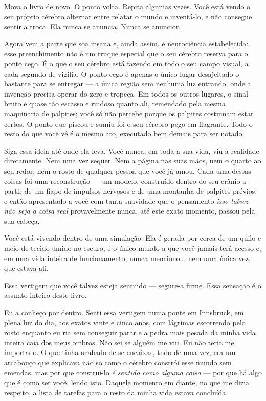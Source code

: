 \documentclass[11pt, twoside, openright]{book}
\begin{document}
Mova o livro de novo. O ponto volta. Repita algumas vezes. Você está vendo o seu próprio cérebro alternar entre relatar o mundo e inventá-lo, e não consegue sentir a troca. Ela nunca se anuncia. Nunca se anunciou.

Agora vem a parte que soa insana e, ainda assim, é neurociência estabelecida: esse preenchimento não é um truque especial que o seu cérebro reserva para o ponto cego. É o que o seu cérebro está fazendo em todo o seu campo visual, a cada segundo de vigília. O ponto cego é apenas o único lugar desajeitado o bastante para se entregar --- a única região sem nenhuma luz entrando, onde a invenção precisa operar do zero e tropeça. Em todos os outros lugares, o sinal bruto é quase tão escasso e ruidoso quanto ali, remendado pela mesma maquinaria de palpites; você só não percebe porque os palpites costumam estar certos. O ponto que piscou e sumiu foi o seu cérebro pego em flagrante. Todo o resto do que você vê é o mesmo ato, executado bem demais para ser notado.

Siga essa ideia até onde ela leva. Você nunca, em toda a sua vida, viu a realidade diretamente. Nem uma vez sequer. Nem a página nas suas mãos, nem o quarto ao seu redor, nem o rosto de qualquer pessoa que você já amou. Cada uma dessas coisas foi uma reconstrução --- um modelo, construído dentro do seu crânio a partir de um fiapo de impulsos nervosos e de uma montanha de palpites prévios, e então apresentado a você com tanta suavidade que o pensamento \textit{isso talvez não seja a coisa real} provavelmente nunca, até este exato momento, passou pela sua cabeça.

Você está vivendo dentro de uma simulação. Ela é gerada por cerca de um quilo e meio de tecido úmido no escuro, é o único mundo a que você jamais terá acesso e, em uma vida inteira de funcionamento, nunca mencionou, nem uma única vez, que estava ali.

Essa vertigem que você talvez esteja sentindo --- segure-a firme. Essa sensação é o assunto inteiro deste livro.

Eu a conheço por dentro. Senti essa vertigem numa ponte em Innsbruck, em plena luz do dia, aos exatos vinte e cinco anos, com lágrimas escorrendo pelo rosto enquanto eu ria sem conseguir parar e a pedra mais pesada da minha vida inteira caía dos meus ombros. Não sei se alguém me viu. Eu não teria me importado. O que tinha acabado de se encaixar, tudo de uma vez, era um arcabouço que explicava não só como o cérebro constrói esse mundo sem emendas, mas por que construí-lo \textit{é sentido como alguma coisa} --- por que há algo que é como ser você, lendo isto. Daquele momento em diante, no que me dizia respeito, a lista de tarefas para o resto da minha vida estava concluída.
\end{document}
